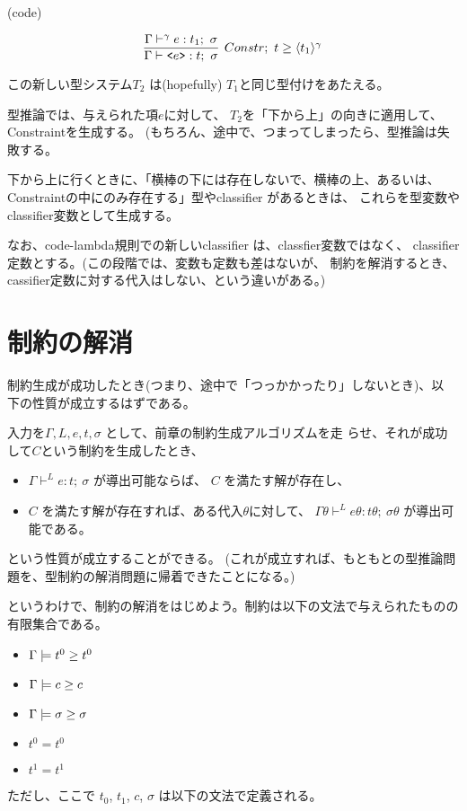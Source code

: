 \documentclass[dvipdfmx]{jsarticle}
\newcommand\longer[2]{{#1} \ord {#2}}
\begin{document}
(code)

\[
  \infer[Constr;~\longer{t}{\codeT{t_1}{\gamma}}]
  {\Gamma \vdash \code{e} : t;~\sigma}
  {\Gamma \vdash^\gamma e : t_1;~\sigma}
\]


この新しい型システム$T_2$ は(hopefully) $T_1$と同じ型付けをあたえる。

型推論では、与えられた項$e$に対して、
$T_2$を「下から上」の向きに適用して、Constraintを生成する。
(もちろん、途中で、つまってしまったら、型推論は失敗する。

下から上に行くときに、「横棒の下には存在しないで、横棒の上、あるいは、
Constraintの中にのみ存在する」型やclassifier があるときは、
これらを型変数やclassifier変数として生成する。

なお、code-lambda規則での新しいclassifier は、classfier変数ではなく、
classifier定数とする。(この段階では、変数も定数も差はないが、
制約を解消するとき、cassifier定数に対する代入はしない、という違いがある。)

\section{制約の解消}

制約生成が成功したとき(つまり、途中で「つっかかったり」しないとき)、以
下の性質が成立するはずである。

入力を$\Gamma, L, e, t,\sigma$ として、前章の制約生成アルゴリズムを走
らせ、それが成功して$C$という制約を生成したとき、
\begin{itemize}
\item
  $\Gamma \vdash^L e: t; ~ \sigma$ が導出可能ならば、
  $C$ を満たす解が存在し、
\item
  $C$ を満たす解が存在すれば、ある代入$\theta$に対して、
  $\Gamma\theta \vdash^L e\theta: t\theta; ~ \sigma\theta$ が導出可能である。
\end{itemize}
という性質が成立することができる。
(これが成立すれば、もともとの型推論問題を、型制約の解消問題に帰着できたことになる。)

というわけで、制約の解消をはじめよう。制約は以下の文法で与えられたものの有限集合である。

\begin{itemize}
\item $\Gamma \models \longer{t^0}{t^0}$
\item $\Gamma \models \longer{c}{c}$
\item $\Gamma \models \longer{\sigma}{\sigma}$
\item $t^0=t^0$
\item $t^1=t^1$
\end{itemize}
ただし、ここで $t_0$, $t_1$, $c$, $\sigma$ は以下の文法で定義される。
\end{document}
